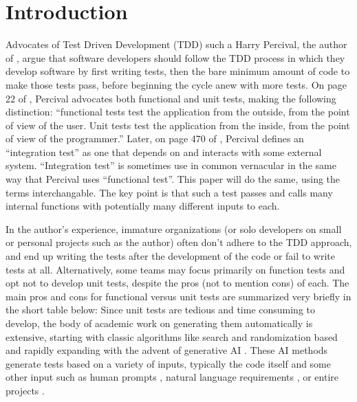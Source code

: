 \section{Introduction}\label{sec:introduction}
Advocates of Test Driven Development (TDD)  such a Harry Percival, the 
author of \cite{percival2014test}, argue that software developers should
 follow the TDD process in which they develop software by first writing tests,
then the bare minimum amount of code to make those tests pass,
before beginning the cycle anew with more tests.
%
On page 22 of \cite{percival2014test}, Percival advocates both functional and unit tests, making the following distinction:
“functional tests test the application from the outside, from the point of view
of the user. Unit tests test the application from the inside,
from the point of view of the programmer.”
%
Later, on page 470 of \cite{percival2014test}, Percival defines an “integration test” as
one that depends on and interacts with some external system.
%
“Integration test” is sometimes use in common vernacular in the same way that
Percival uses “functional test”.
%
This paper will do the same, using the terms interchangable.  The key point is
that such a test passes and calls many internal functions with potentially many
 different inputs to each.

In the author’s experience, immature organizations (or solo developers
on small or personal projects such as the author) often don’t adhere to the
 TDD approach, and end up writing the tests after the development of the code or
fail to write tests at all.
%
Alternatively, some teams may focus primarily on function tests
and opt not to develop unit tests, despite the pros (not to mention cons) of
each.
%
The main pros and cons for functional versus unit tests are summarized very
briefly in the short table below:
%
Since unit tests are tedious and time consuming to develop, the body of academic
work on generating them automatically is extensive, starting with classic
algorithms like search and randomization based \cite{Luk22Pynguin0170} and
rapidly expanding with the advent of generative AI 
\cite{bhatia2023unit,takerngsaksiri2024tdd,wang2024software}.
%
These AI methods generate tests based on a variety of inputs, typically the code
itself and some other input such as human prompts \cite{lahiri2023interactivecodegenerationtestdriven},
natural language requirements \cite{wang2024software}, or entire projects
\cite{rao2023cat}.

